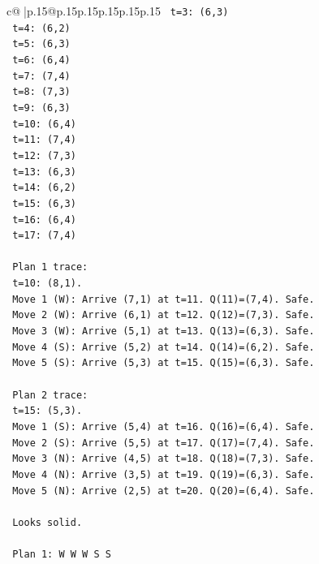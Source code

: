 \documentclass{article}
\begin{document}
{\begin{supertabular}{c@{$\;$}|p{.15\linewidth}@{}p{.15\linewidth}p{.15\linewidth}p{.15\linewidth}p{.15\linewidth}p{.15\linewidth}}
{{{\texttt{   t=3: (6,3)} \\
\texttt{   t=4: (6,2)} \\
\texttt{   t=5: (6,3)} \\
\texttt{   t=6: (6,4)} \\
\texttt{   t=7: (7,4)} \\
\texttt{   t=8: (7,3)} \\
\texttt{   t=9: (6,3)} \\
\texttt{   t=10: (6,4)} \\
\texttt{   t=11: (7,4)} \\
\texttt{   t=12: (7,3)} \\
\texttt{   t=13: (6,3)} \\
\texttt{   t=14: (6,2)} \\
\texttt{   t=15: (6,3)} \\
\texttt{   t=16: (6,4)} \\
\texttt{   t=17: (7,4)} \\
\\ 
\texttt{   Plan 1 trace:} \\
\texttt{   t=10: (8,1).} \\
\texttt{   Move 1 (W): Arrive (7,1) at t=11. Q(11)=(7,4). Safe.} \\
\texttt{   Move 2 (W): Arrive (6,1) at t=12. Q(12)=(7,3). Safe.} \\
\texttt{   Move 3 (W): Arrive (5,1) at t=13. Q(13)=(6,3). Safe.} \\
\texttt{   Move 4 (S): Arrive (5,2) at t=14. Q(14)=(6,2). Safe.} \\
\texttt{   Move 5 (S): Arrive (5,3) at t=15. Q(15)=(6,3). Safe.} \\
\\ 
\texttt{   Plan 2 trace:} \\
\texttt{   t=15: (5,3).} \\
\texttt{   Move 1 (S): Arrive (5,4) at t=16. Q(16)=(6,4). Safe.} \\
\texttt{   Move 2 (S): Arrive (5,5) at t=17. Q(17)=(7,4). Safe.} \\
\texttt{   Move 3 (N): Arrive (4,5) at t=18. Q(18)=(7,3). Safe.} \\
\texttt{   Move 4 (N): Arrive (3,5) at t=19. Q(19)=(6,3). Safe.} \\
\texttt{   Move 5 (N): Arrive (2,5) at t=20. Q(20)=(6,4). Safe.} \\
\\ 
\texttt{   Looks solid.} \\
\\ 
\texttt{   Plan 1: W W W S S} \\
}}}
\end{supertabular}}
\end{document}
